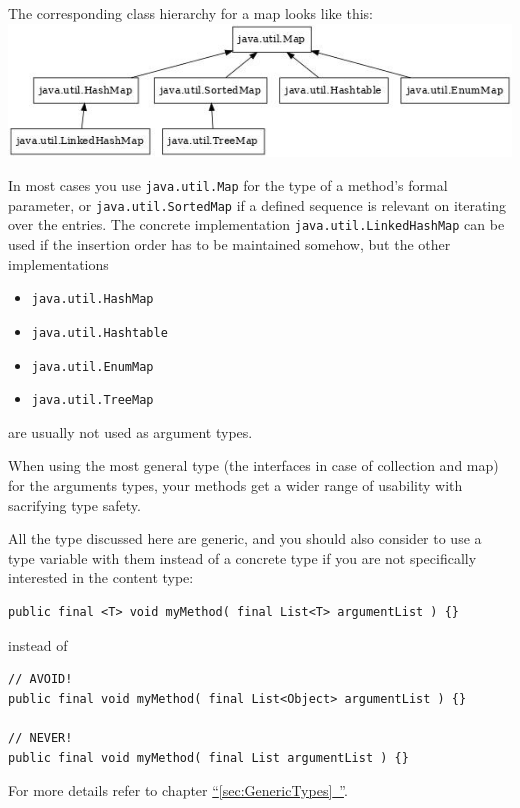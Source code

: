 \documentclass[11pt,a4paper, titlepage, parskip=half, headsepline, footsepline, cleardoublepage=current, headheight=1cm]{scrbook}
\newcommand*{\tqfullref}[1]{\hyperref[{#1}]{“\ref*{#1}~\nameref*{#1}”}}
\begin{document}
The corresponding class hierarchy for a map looks like this:
\newline
\includegraphics{map}
\newline

In most cases you use \lstinline|java.util.Map|\autocite{ORACLE_DOC_MAP_INTERFACE} for the type of a method's formal parameter, or \lstinline|java.util.SortedMap|\autocite{ORACLE_DOC_SORTEDMAP_INTERFACE} if a defined sequence is relevant on iterating over the entries. The concrete implementation \lstinline|java.util.LinkedHashMap|\autocite{ORACLE_DOC_LINKEDHASHMAP_CLASS} can be used if the insertion order has to be maintained somehow, but the other implementations
\begin{itemize}
\item{\lstinline|java.util.HashMap|\autocite{ORACLE_DOC_HASHMAP_CLASS}}
\item{\lstinline|java.util.Hashtable|\autocite{ORACLE_DOC_HASHTABLE_CLASS}}
\item{\lstinline|java.util.EnumMap|\autocite{ORACLE_DOC_ENUMMAP_CLASS}}
\item{\lstinline|java.util.TreeMap|\autocite{ORACLE_DOC_TREEMAP_CLASS}}
\end{itemize}
are usually not used as argument types.

When using the most general type (the interfaces in case of collection and map) for the arguments types, your methods get a wider range of usability with sacrifying type safety.

All the type discussed here are generic, and you should also consider to use a type variable with them instead of a concrete type if you are not specifically interested in the content type:
\begin{lstlisting}
public final <T> void myMethod( final List<T> argumentList ) {}
\end{lstlisting}
instead of
\begin{lstlisting}
// AVOID!
public final void myMethod( final List<Object> argumentList ) {}

// NEVER!
public final void myMethod( final List argumentList ) {}
\end{lstlisting}
For more details refer to chapter \tqfullref{sec:GenericTypes}.
 
\end{document}
